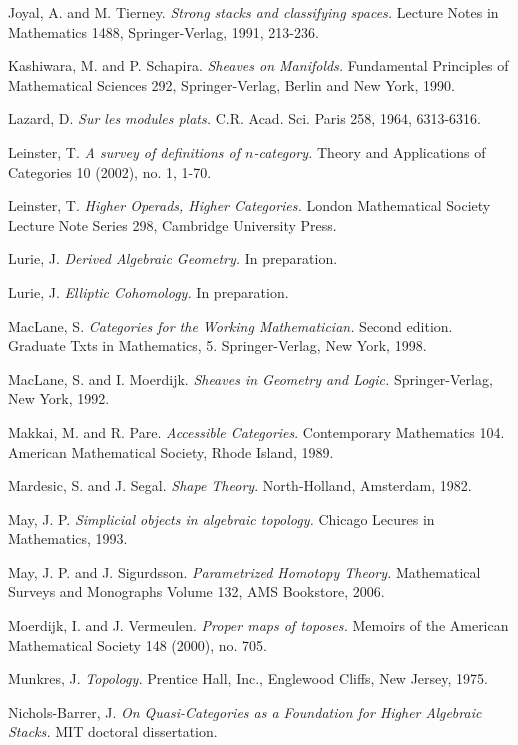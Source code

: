 \documentclass{report}[10pt, final]
\theoremstyle{definition}
\begin{document}
\begin{thebibliography}{99}
 Joyal, A. and M. Tierney. {\it Strong stacks and classifying spaces.} 
Lecture Notes in Mathematics 1488, Springer-Verlag, 1991, 213-236.

 Kashiwara, M. and P. Schapira. {\it Sheaves on Manifolds.} Fundamental Principles of Mathematical Sciences 292, Springer-Verlag, Berlin and New York, 1990. 

 Lazard, D. {\it Sur les modules plats.} C.R.
Acad. Sci. Paris 258, 1964, 6313-6316.

 Leinster, T. {\it A survey of definitions of $n$-category.} Theory and Applications of Categories 10 (2002), no. 1, 1-70.

 Leinster, T. {\it Higher Operads, Higher Categories.} London Mathematical Society Lecture Note Series 298, Cambridge University Press.

 Lurie, J. {\it Derived Algebraic Geometry.} In preparation.

 Lurie, J. {\it Elliptic Cohomology.} In preparation.

 MacLane, S. {\it Categories for the Working Mathematician.} Second edition. Graduate Txts in Mathematics, 5. Springer-Verlag, New York, 1998.

 MacLane, S. and I. Moerdijk. {\it Sheaves in Geometry and Logic.} Springer-Verlag, New York, 1992.

 Makkai, M. and R. Pare. {\it Accessible Categories}.
Contemporary Mathematics 104. American Mathematical Society, Rhode
Island, 1989.

 Mardesic, S. and J. Segal. {\it Shape Theory}.
North-Holland, Amsterdam, 1982.

 May, J. P. {\it Simplicial objects in algebraic topology.} Chicago Lecures in Mathematics, 1993.

 May, J. P. and J. Sigurdsson. {\it Parametrized Homotopy Theory.} Mathematical Surveys and Monographs Volume 132, AMS Bookstore, 2006.

 Moerdijk, I. and J. Vermeulen. {\it Proper maps of toposes.} Memoirs of the American Mathematical Society 148 (2000), no. 705.

 Munkres, J. {\it Topology.} Prentice Hall,
Inc., Englewood Cliffs, New Jersey, 1975.

 Nichols-Barrer, J. {\it On Quasi-Categories as a Foundation for Higher Algebraic Stacks.} MIT doctoral dissertation.


\end{thebibliography}
\end{document}
